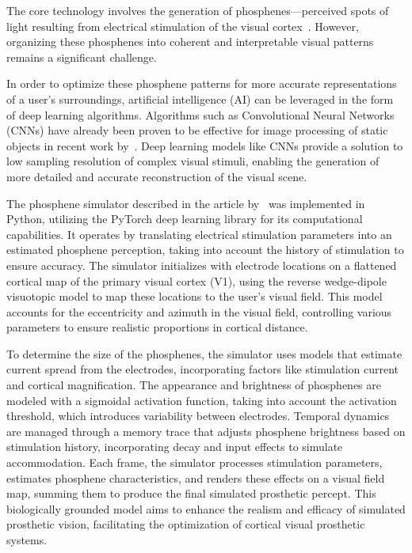 \documentclass[10pt]{article}
\begin{document}
The core technology involves the generation of phosphenes—perceived spots of
light resulting from electrical stimulation of the visual
cortex~\parencite{vandergrintenBiologicallyPlausiblePhosphene2024}. However,
organizing these phosphenes into coherent and interpretable visual patterns
remains a significant challenge.

In order to optimize these phosphene patterns for more accurate representations
of a user's surroundings, artificial intelligence (AI) can be leveraged in the
form of deep learning algorithms. Algorithms such as Convolutional Neural
Networks (CNNs) have already been proven to be effective for image processing of
static objects in recent work
by~\textcite{deruytervansteveninckEndtoendOptimizationProsthetic2022}. Deep
learning models like CNNs provide a solution to low sampling resolution of
complex visual stimuli, enabling the generation of more detailed and accurate
reconstruction of the visual scene.

The phosphene simulator described in the article
by~\textcite{deruytervansteveninckEndtoendOptimizationProsthetic2022} was
implemented in Python, utilizing the PyTorch deep learning library for its
computational capabilities. It operates by translating electrical stimulation
parameters into an estimated phosphene perception, taking into account the
history of stimulation to ensure accuracy. The simulator initializes with
electrode locations on a flattened cortical map of the primary visual cortex
(V1), using the reverse wedge-dipole visuotopic model to map these locations to
the user's visual field. This model accounts for the eccentricity and azimuth in
the visual field, controlling various parameters to ensure realistic proportions
in cortical distance.

To determine the size of the phosphenes, the simulator uses models that estimate
current spread from the electrodes, incorporating factors like stimulation
current and cortical magnification. The appearance and brightness of phosphenes
are modeled with a sigmoidal activation function, taking into account the
activation threshold, which introduces variability between electrodes. Temporal
dynamics are managed through a memory trace that adjusts phosphene brightness
based on stimulation history, incorporating decay and input effects to simulate
accommodation. Each frame, the simulator processes stimulation parameters,
estimates phosphene characteristics, and renders these effects on a visual field
map, summing them to produce the final simulated prosthetic percept. This
biologically grounded model aims to enhance the realism and efficacy of
simulated prosthetic vision, facilitating the optimization of cortical visual
prosthetic systems.
\end{document}
